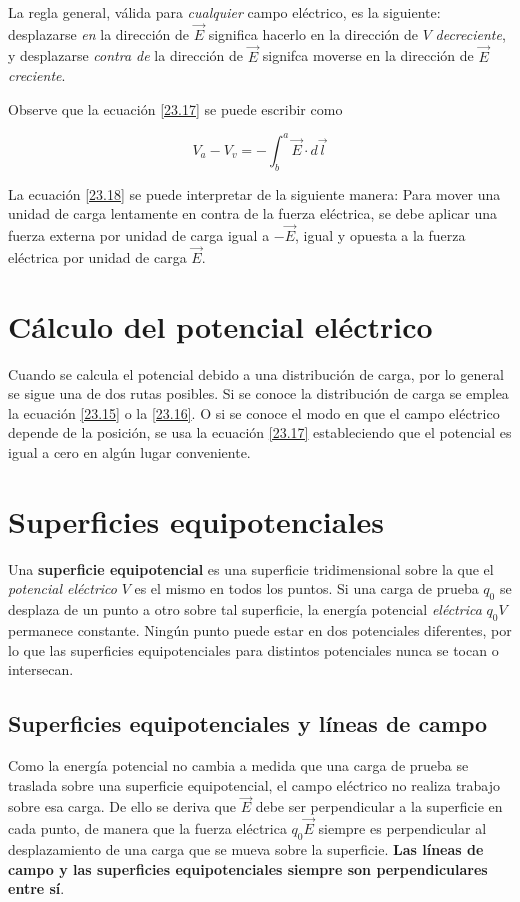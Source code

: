 La regla general, válida para \textit{cualquier} campo eléctrico, es la siguiente: desplazarse \textit{en} la dirección de $\vec{E}$ significa hacerlo en la dirección de $V$ \textit{decreciente}, y desplazarse \textit{contra de} la dirección de $\vec{E}$ signifca moverse en la dirección de $\vec{E}$ \textit{creciente}.

Observe que la ecuación \ref{23.17} se puede escribir como 

\begin{equation}\label{23.18}
V_a-V_v=-\int_b^{a}\vec{E}\cdot d\vec{l}
\end{equation}

La ecuación \ref{23.18} se puede interpretar de la siguiente manera: Para mover una unidad de carga lentamente en contra de la fuerza eléctrica, se debe aplicar una fuerza externa por unidad de carga igual a $-\vec{E}$, igual y opuesta a la fuerza eléctrica por unidad de carga $\vec{E}$.

\section{Cálculo del potencial eléctrico}
Cuando se calcula el potencial debido a una distribución de carga, por lo general se sigue una de dos rutas posibles. Si se conoce la distribución de carga se emplea la ecuación \ref{23.15} o la \ref{23.16}. O si se conoce el modo en que el campo eléctrico depende de la posición, se usa la ecuación \ref{23.17} estableciendo que el potencial es igual a cero en algún lugar conveniente.

\section{Superficies equipotenciales}
Una \textbf{superficie equipotencial} es una superficie tridimensional sobre la que el \textit{potencial eléctrico} $V$ es el mismo en todos los puntos. Si una carga de prueba $q_0$ se desplaza de un punto a otro sobre tal superficie, la energía potencial \textit{eléctrica} $q_0V$ permanece constante. Ningún punto puede estar en dos potenciales diferentes, por lo que las superficies equipotenciales para distintos potenciales nunca se tocan o intersecan.

\subsection{Superficies equipotenciales y líneas de campo}
Como la energía potencial no cambia a medida que una carga de prueba se traslada sobre una superficie equipotencial, el campo eléctrico no realiza trabajo sobre esa carga. De ello se deriva que $\vec{E}$ debe ser perpendicular a la superficie en cada punto, de manera que la fuerza eléctrica $q_0\vec{E}$ siempre es perpendicular al desplazamiento de una carga que se mueva sobre la superficie. \textbf{Las líneas de campo y las superficies equipotenciales siempre son perpendiculares entre sí}.

